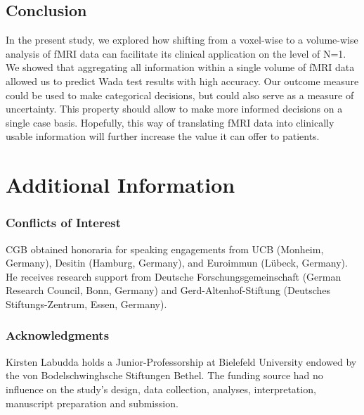\documentclass[fleqn,10pt]{SelfArx} %
\begin{document}
\subsection*{Conclusion}
In the present study, we explored how shifting from a voxel-wise to a volume-wise analysis of fMRI data can facilitate its clinical application on the level of N=1. We showed that aggregating all information within a single volume of fMRI data allowed us to predict Wada test results with high accuracy. Our outcome measure could be used to make categorical decisions, but could also serve as a measure of uncertainty. This property should allow to make more informed decisions on a single case basis. Hopefully, this way of translating fMRI data into clinically usable information will further increase the value it can offer to patients.


\section*{Additional Information}

\subsubsection*{Conflicts of Interest}
\small{CGB obtained honoraria for speaking engagements from UCB (Monheim, Germany), Desitin (Hamburg, Germany), and Euroimmun (Lübeck, Germany). He receives research support from Deutsche Forschungsgemeinschaft (German Research Council, Bonn, Germany) and Gerd-Altenhof-Stiftung (Deutsches Stiftungs-Zentrum, Essen, Germany).}

\subsubsection*{Acknowledgments}
\small{Kirsten Labudda holds a Junior-Professorship at Bielefeld University endowed by the von Bodelschwinghsche Stiftungen Bethel. The funding source had no influence on the study's design, data collection, analyses, interpretation, manuscript preparation and submission.}
\end{document}
